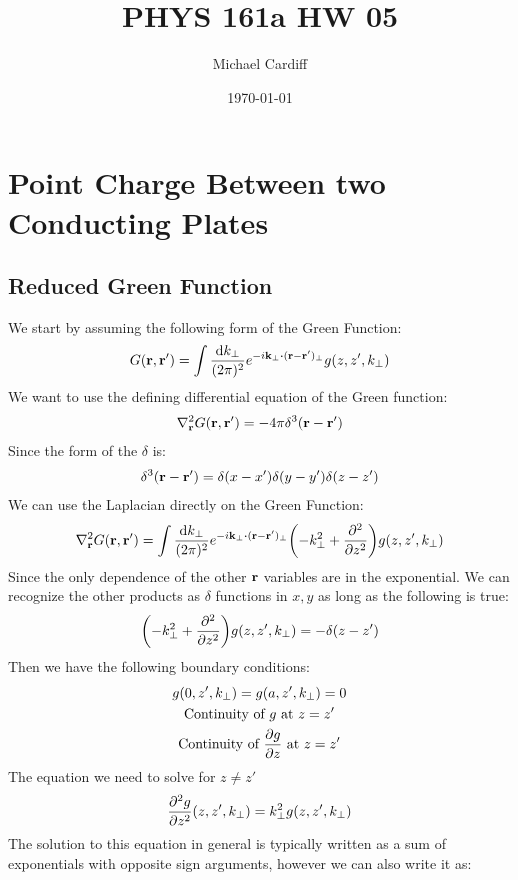 \documentclass[12pt]{article}
\title{\vspace{-3em}PHYS 161a HW 05}
\author{Michael Cardiff}
\date{\today}
\begin{document}
\maketitle

\section{Point Charge Between two Conducting Plates}
\subsection{Reduced Green Function}
We start by assuming the following form of the Green Function:
\begin{align*}
  G(\vb{r,r}')=\int\frac{\dd{k_{\perp}}}{(2\pi)^2}
  e^{-i\vb{k}_\perp\vdot(\vb{r-r}')_\perp}g(z,z',k_\perp)
\end{align*}
We want to use the defining differential equation of the Green function:
\begin{align*}
  \laplacian_{\vb{r}}G(\vb{r,r}')=-4\pi\delta^3\qty(\vb{r-r}')
\end{align*}
Since the form of the $\delta$ is:
\begin{align*}
  \delta^3\qty(\vb{r-r}')=\delta(x-x')\delta(y-y')\delta(z-z')
\end{align*}
We can use the Laplacian directly on the Green Function:
\begin{align*}
  \laplacian_{\vb{r}}G(\vb{r,r}')=\int\frac{\dd{k_{\perp}}}{(2\pi)^2}
  e^{-i\vb{k}_\perp\vdot(\vb{r-r}')_\perp}\qty(-k_\perp^2+\pdv[2]{z})g(z,z',k_\perp)
\end{align*}
Since the only dependence of the other $\vb{r}$ variables are in the exponential. We can recognize the other products as $\delta$ functions in $x,y$ as long as the following is true:
\begin{align*}
  \qty(-k_\perp^2+\pdv[2]{z})g(z,z',k_\perp)=-\delta(z-z')
\end{align*}
Then we have the following boundary conditions:
\begin{gather*}
  g(0,z',k_\perp)=g(a,z',k_\perp)=0\\
  \text{Continuity of $g$ at $z=z'$}\\
  \text{Continuity of $\pdv{g}{z}$ at $z=z'$}
\end{gather*}
The equation we need to solve for $z\neq z'$
\begin{align*}
  \pdv[2]{g}{z}\qty(z,z',k_\perp) =k_\perp^2g(z,z',k_\perp)
\end{align*}
The solution to this equation in general is typically written as a sum of exponentials with opposite sign arguments, however we can also write it as:
\end{document}
